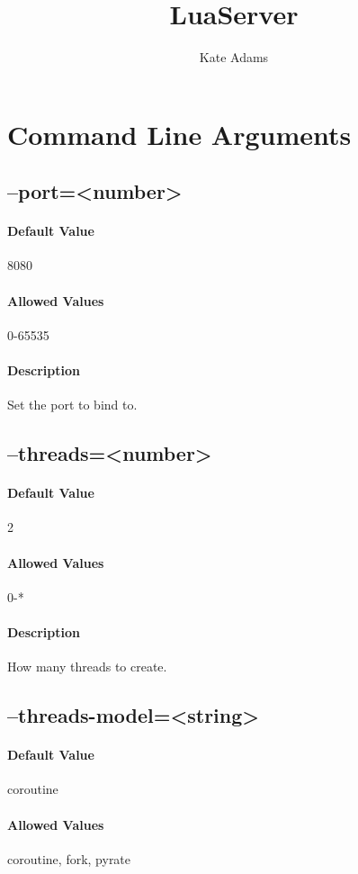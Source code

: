 \documentclass[a4paper,11pt]{report}
\title{LuaServer}
\author{Kate Adams}
\begin{document}
\maketitle
\tableofcontents

\chapter{Command Line Arguments}

\section{--port=<number>}
\subsubsection{Default Value}{8080}
\subsubsection{Allowed Values}{0-65535}
\subsubsection{Description}{Set the port to bind to.}

\section{--threads=<number>}
\subsubsection{Default Value}{2}
\subsubsection{Allowed Values}{0-*}
\subsubsection{Description}{How many threads to create.}

\section{--threads-model=<string>}
\subsubsection{Default Value}{coroutine}
\subsubsection{Allowed Values}{coroutine, fork, pyrate}
\end{document}
